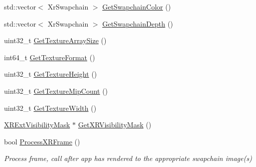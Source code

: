 \begin{DoxyCompactItemize}
\item 
std\+::vector$<$ Xr\+Swapchain $>$ \mbox{\hyperlink{class_open_x_r_provider_1_1_x_r_render_manager_ae97da10203b51fe701ccd57b4299bc9b}{Get\+Swapchain\+Color}} ()
\item 
std\+::vector$<$ Xr\+Swapchain $>$ \mbox{\hyperlink{class_open_x_r_provider_1_1_x_r_render_manager_a0835882f612c14539f3226425b398bcb}{Get\+Swapchain\+Depth}} ()
\item 
uint32\+\_\+t \mbox{\hyperlink{class_open_x_r_provider_1_1_x_r_render_manager_a87fa0e627b58a7892aa3e6a0efd9ab9b}{Get\+Texture\+Array\+Size}} ()
\item 
int64\+\_\+t \mbox{\hyperlink{class_open_x_r_provider_1_1_x_r_render_manager_aa5216277ffb9f00b43ba78fe0019da3f}{Get\+Texture\+Format}} ()
\item 
uint32\+\_\+t \mbox{\hyperlink{class_open_x_r_provider_1_1_x_r_render_manager_ae019694eb7b728af00f29eb09872a763}{Get\+Texture\+Height}} ()
\item 
uint32\+\_\+t \mbox{\hyperlink{class_open_x_r_provider_1_1_x_r_render_manager_abee521a9347693c61be94f78af0a1602}{Get\+Texture\+Mip\+Count}} ()
\item 
uint32\+\_\+t \mbox{\hyperlink{class_open_x_r_provider_1_1_x_r_render_manager_a6d9fe3b04d4786f66455cac3bd9fa115}{Get\+Texture\+Width}} ()
\item 
\mbox{\hyperlink{class_open_x_r_provider_1_1_x_r_ext_visibility_mask}{X\+R\+Ext\+Visibility\+Mask}} $\ast$ \mbox{\hyperlink{class_open_x_r_provider_1_1_x_r_render_manager_a7bcc0021dd457e08fe53f7841d0c7c66}{Get\+X\+R\+Visibility\+Mask}} ()
\item 
bool \mbox{\hyperlink{class_open_x_r_provider_1_1_x_r_render_manager_aebe4bca3de5bdec26ea4dfbc641273b5}{Process\+X\+R\+Frame}} ()
\begin{DoxyCompactList}\small\item\em Process frame, call after app has rendered to the appropriate swapchain image(s) \end{DoxyCompactList}\end{DoxyCompactItemize}

